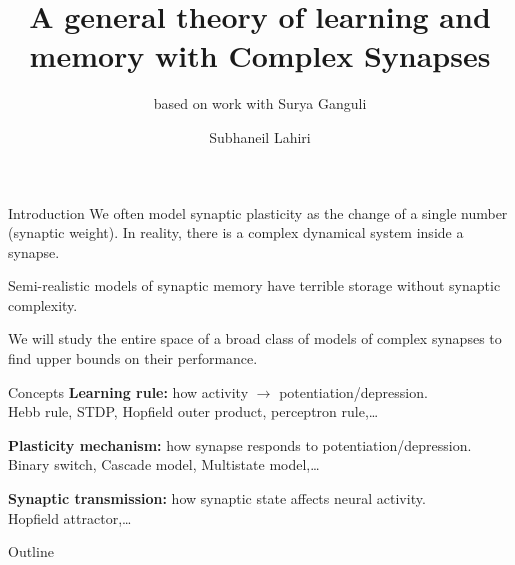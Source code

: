 \documentclass{beamer}%
\title[Complex synapses]{A general theory of learning and memory with Complex Synapses}
\subtitle{\small{based on work with Surya Ganguli}
}
\author{Subhaneil Lahiri%
}
\institute[Stanford]{%
Stanford University, Applied Physics
}
\begin{document}

\begin{frame}
%
 \titlepage
%
\end{frame}


\begin{frame}{Introduction}
%
 We often model synaptic plasticity as the change of a single number (synaptic weight).
 In reality, there is a complex dynamical system inside a synapse.

 \vp Semi-realistic models of synaptic memory have terrible storage without synaptic complexity.

 \vp We will study the entire space of a broad class of models of complex synapses to find upper bounds on their performance.

%
\end{frame}


\begin{frame}{Concepts}
%
 \textbf{Learning rule:} how activity $\to$ potentiation/depression.\\
 \hp \eg Hebb rule, STDP, Hopfield outer product, perceptron rule,\ldots

 \vp \textbf{Plasticity mechanism:} how synapse responds to potentiation/depression.\\
 \hp \eg Binary switch, Cascade model, Multistate model,\ldots

 \vp \textbf{Synaptic transmission:} how synaptic state affects neural activity.\\
 \hp \eg Hopfield attractor,\ldots

%
\end{frame}


\begin{frame}{Outline}
%
 \tableofcontents[hideallsubsections]
%
\end{frame}
\end{document}
